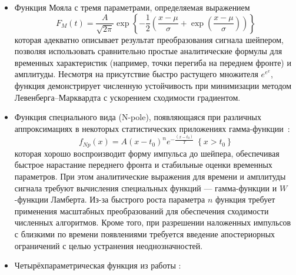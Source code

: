 \begin{itemize}
    \item Функция Мояла \cite{moyalFunction} с тремя параметрами, определяемая выражением
    \begin{equation}
        F_M(t) = \frac{A}{\sqrt{2 \pi}} \exp \left\{ - \frac{1}{2} \left(\frac{x - \mu}{\sigma}+ \exp\left(\frac{x - \mu}{\sigma}\right)\right) \right\}
        \label{eq:moyalFNormed}
    \end{equation}
    которая адекватно описывает результат преобразования сигнала
    шейпером, позволяя использовать сравнительно простые аналитические формулы
    для временных характеристик (например, точки перегиба на переднем фронте) и амплитуды. Несмотря на присутствие быстро растущего множителя
    $e^{e^x}$, функция демонстрирует численную устойчивость при минимизации методом Левенберга–Марквардта с ускорением сходимости градиентом.
    \item Функция специального вида (N-pole), появляющаяся при различных
    аппроксимациях в некоторых статистических приложениях гамма-функции~\cite{gamma-stegun}:
    \begin{equation}
        f_{Np}\left(x\right)=A\left(x-t_{0}\right)^{n}e^{-\frac{\left(x-t_{0}\right)}{T}}\ \left\{x>t_{0}\right\}
    \end{equation}
    которая хорошо воспроизводит форму импульса до шейпера, обеспечивая
    быстрое нарастание переднего фронта и стабильные оценки временных
    параметров. При этом аналитические выражения для времени и амплитуды
    сигнала требуют вычисления специальных функций --- гамма-функции и
    $W$-функции Ламберта. Из-за быстрого роста параметра $n$ функция
    требует применения масштабных преобразований для обеспечения
    сходимости численных алгоритмов. Кроме того, при разрешении
    наложенных импульсов с близкими по времени появлениями требуется
    введение апостериорных ограничений с целью устранения
    неоднозначностей.
    \item Четырёхпараметрическая функция из работы \cite{optimal-pulse-proc-samoyl}:

\end{itemize}

